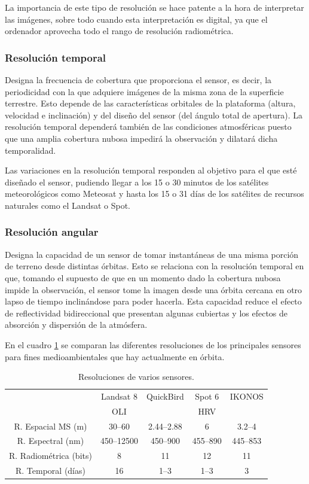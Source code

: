 La importancia de este tipo de resolución se hace patente a la hora de interpretar las imágenes, sobre todo cuando esta interpretación es digital, ya que el ordenador aprovecha todo el rango de resolución radiométrica.

\subsubsection{Resolución temporal}
Designa la frecuencia de cobertura que proporciona el sensor, es decir, la periodicidad con la que adquiere imágenes de la misma zona de la superficie terrestre. Esto depende de las características orbitales de la plataforma (altura, velocidad e inclinación) y del diseño del sensor (del ángulo total de apertura). La resolución temporal dependerá también de las condiciones atmosféricas puesto que una amplia cobertura nubosa impedirá la observación y dilatará dicha temporalidad.\Sep

Las variaciones en la resolución temporal responden al objetivo para el que esté diseñado el sensor, pudiendo llegar a los 15 o 30 minutos de los satélites meteorológicos como Meteosat y hasta los 15 o 31 días de los satélites de recursos naturales como el Landsat o Spot.

\subsubsection{Resolución angular}
Designa la capacidad de un sensor de tomar instantáneas de una misma porción de terreno desde distintas órbitas. Esto se relaciona con la resolución temporal en que, tomando el supuesto de que en un momento dado la cobertura nubosa impide la observación, el sensor tome la imagen desde una órbita cercana en otro lapso de tiempo inclinándose para poder hacerla. Esta capacidad reduce el efecto de reflectividad bidireccional que presentan algunas cubiertas y los efectos de absorción y dispersión de la atmósfera.\Sep

En el cuadro \ref{tab:resoluciones} se comparan las diferentes resoluciones de los principales sensores para fines medioambientales que hay actualmente en órbita.

\begin{table}[ht]
	\centering
	\begin{tabular}{@{}ccccc@{}}
	\toprule[0.4mm]
	& Landsat 8 & QuickBird & Spot 6 & IKONOS \\
	& OLI & & HRV & \\
	\midrule
	R. Espacial MS (m) & 30--60 & 2.44--2.88 & 6 & 3.2--4 \\
	R. Espectral (nm) & 450--12500 & 450--900 & 455--890 & 445--853 \\
	R. Radiométrica (bits) & 8 & 11 & 12 & 11 \\
	R. Temporal (días) & 16 & 1--3 & 1--3 & 3 \\
	\bottomrule[0.4mm]
	\end{tabular}
	\caption[Resoluciones de varios sensores]{Resoluciones de varios sensores.}
	\label{tab:resoluciones}
\end{table}

